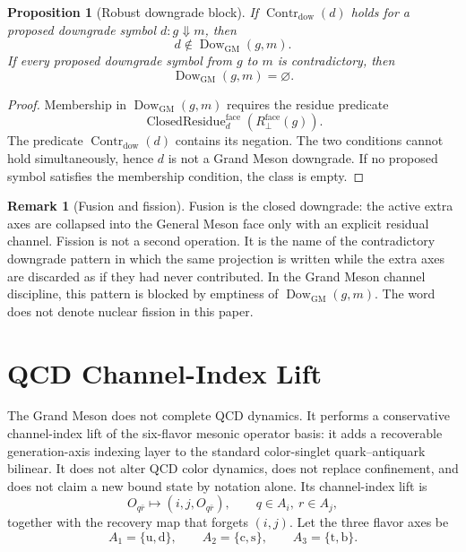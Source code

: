 \documentclass[11pt]{article}
\theoremstyle{definition}
\newtheorem{remark}[definition]{Remark}
\theoremstyle{plain}
\newtheorem{proposition}[definition]{Proposition}
\DeclareMathOperator{\Dow}{Dow}
\DeclareMathOperator{\Contr}{Contr}
\DeclareMathOperator{\ClosedResidue}{ClosedResidue}
\newcommand{\qu}{\mathrm u}
\newcommand{\qd}{\mathrm d}
\newcommand{\qc}{\mathrm c}
\newcommand{\qs}{\mathrm s}
\newcommand{\qt}{\mathrm t}
\newcommand{\qb}{\mathrm b}
\begin{document}
\begin{proposition}[Robust downgrade block]
If \(\Contr_{\mathrm{dow}}(d)\) holds for a proposed downgrade symbol
\(d:g\Downarrow m\), then
\[
  d\notin\Dow_{\mathrm{GM}}(g,m).
\]
If every proposed downgrade symbol from \(g\) to \(m\) is contradictory, then
\[
  \Dow_{\mathrm{GM}}(g,m)=\varnothing .
\]
\end{proposition}

\begin{proof}
Membership in \(\Dow_{\mathrm{GM}}(g,m)\) requires the residue predicate
\[
  \ClosedResidue^{\mathrm{face}}_d(R^{\mathrm{face}}_{\perp}(g)).
\]
The predicate \(\Contr_{\mathrm{dow}}(d)\) contains its negation.  The two
conditions cannot hold simultaneously, hence \(d\) is not a Grand Meson
downgrade.  If no proposed symbol satisfies the membership condition, the
class is empty.
\end{proof}

\begin{remark}[Fusion and fission]
Fusion is the closed downgrade: the active extra axes are collapsed into
the General Meson face only with an explicit residual channel.  Fission is
not a second operation.  It is the name of the contradictory downgrade
pattern in which the same projection is written while the extra axes are
discarded as if they had never contributed.  In the Grand Meson channel
discipline, this pattern is blocked by emptiness of
\(\Dow_{\mathrm{GM}}(g,m)\).  The word does not denote nuclear fission in
this paper.
\end{remark}

\section{QCD Channel-Index Lift}

The Grand Meson does not complete QCD dynamics.  It performs a conservative
channel-index lift of the six-flavor mesonic operator basis: it adds a
recoverable generation-axis indexing layer to the standard color-singlet
quark--antiquark bilinear.  It does not alter QCD color dynamics, does not
replace confinement, and does not claim a new bound state by notation
alone.  Its channel-index lift is
\[
  O_{q\bar r}\longmapsto(i,j,O_{q\bar r}),
  \qquad q\in A_i,\ r\in A_j,
\]
together with the recovery map that forgets \((i,j)\).  Let the three
flavor axes be
\[
  A_1=\{\qu,\qd\},\qquad
  A_2=\{\qc,\qs\},\qquad
  A_3=\{\qt,\qb\}.
\]
\end{document}
